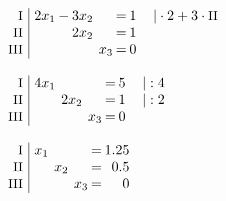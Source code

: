 \begin{equation*}
\begin{array}{l}
\\ \\
\setlength{\arraycolsep}{1pt}
\begin{array}{r|rcrcrcrl}
    \text{\small I } &\; 2x_{1} & - & 3x_{2} &  &       & = & 1 & \quad|\cdot2+3\cdot\text{\small II} \\
   \text{\small II } &\;        &   & 2x_{2} &  &       & = & 1 &                                     \\
  \text{\small III } &\;        &   &        &  & x_{3} & = & 0 &                                       
\end{array}
\\ \\
\setlength{\arraycolsep}{1pt}
\begin{array}{r|rcrcrcrl}
    \text{\small I } &\; 4x_{1} &  &        &  &       & = & 5 & \quad|:4 \\
   \text{\small II } &\;        &  & 2x_{2} &  &       & = & 1 & \quad|:2 \\
  \text{\small III } &\;        &  &        &  & x_{3} & = & 0 &            
\end{array}
\\ \\
\setlength{\arraycolsep}{1pt}
\begin{array}{r|rcrcrcrl}
    \text{\small I } &\; x_{1} &  &       &  &       & = & 1.25 & \\
   \text{\small II } &\;       &  & x_{2} &  &       & = &  0.5 & \\
  \text{\small III } &\;       &  &       &  & x_{3} & = &    0 &   
\end{array}
\end{array}
\end{equation*}

